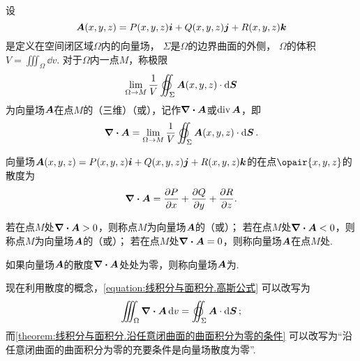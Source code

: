 \begin{definition}[空间中的散度]
\def\defofdiv{\lim\limits_{\Omega \to M} \frac{1}{V} \varoiint_{\Sigma} \mat{A}(x,y,z) \cdot \dd{\mat{S}}}%
设\[
\boldsymbol{A}(x,y,z)=P(x,y,z)\boldsymbol{i}+Q(x,y,z)\boldsymbol{j}+R(x,y,z)\boldsymbol{k}
\]是定义在空间闭区域\(\Omega\)内的向量场，
\(\Sigma\)是\(\Omega\)的边界曲面的外侧，
\(\Omega\)的体积\(V = \iiint_{\Omega} \dd{v}\).
对于\(\Omega\)内一点\(M\)，称极限\[
\defofdiv
\]为向量场\(\boldsymbol{A}\)在点\(M\)的（三维）（或），记作\(\div{\boldsymbol{A}}\)或\(\operatorname{div}\boldsymbol{A}\)，即\[
\div{\mat{A}} = \defofdiv.
\]
\end{definition}

\begin{theorem}
向量场\(\boldsymbol{A}(x,y,z)=P(x,y,z)\boldsymbol{i}+Q(x,y,z)\boldsymbol{j}+R(x,y,z)\boldsymbol{k}\)的在点\(\opair{x,y,z}\)的散度为\[
\div{\boldsymbol{A}} = \pdv{P}{x}+\pdv{Q}{y}+\pdv{R}{z}.
\]
\end{theorem}

\begin{definition}
若在点\(M\)处\(\div{\boldsymbol{A}}>0\)，则称点\(M\)为向量场\(\boldsymbol{A}\)的（或）；%
若在点\(M\)处\(\div{\boldsymbol{A}}<0\)，则称点\(M\)为向量场\(\boldsymbol{A}\)的（或）；%
若在点\(M\)处\(\div{\boldsymbol{A}}=0\)，则称向量场\(\boldsymbol{A}\)在点\(M\)处.

如果向量场\(\boldsymbol{A}\)的散度\(\div{\boldsymbol{A}}\)处处为零，则称向量场\(\boldsymbol{A}\)为.
\end{definition}

现在利用散度的概念，\cref{equation:线积分与面积分.高斯公式} 可以改写为
\begin{equation}\label{equation:线积分与面积分.高斯公式1}
	\iiint_{\Omega} \div{\mat{A}} \dd{v} = \varoiint_{\Sigma} \mat{A} \cdot \dd{\mat{S}};
\end{equation}
而\cref{theorem:线积分与面积分.沿任意闭曲面的曲面积分为零的条件}
可以改写为“沿任意闭曲面的曲面积分为零的充要条件是向量场散度为零”.

